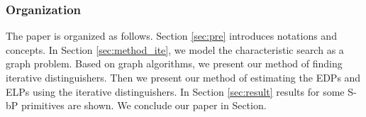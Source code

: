 
\subsubsection{Organization}
The paper is organized as follows. Section \ref{sec:pre} introduces notations and concepts. In Section \ref{sec:method_ite}, we model the characteristic search as a graph problem. Based on graph algorithms, we present our method of finding iterative distinguishers. Then we present our method of estimating the EDPs and ELPs using the iterative distinguishers. In Section \ref{sec:result} results for some S-bP primitives are shown. We conclude our paper in Section.
